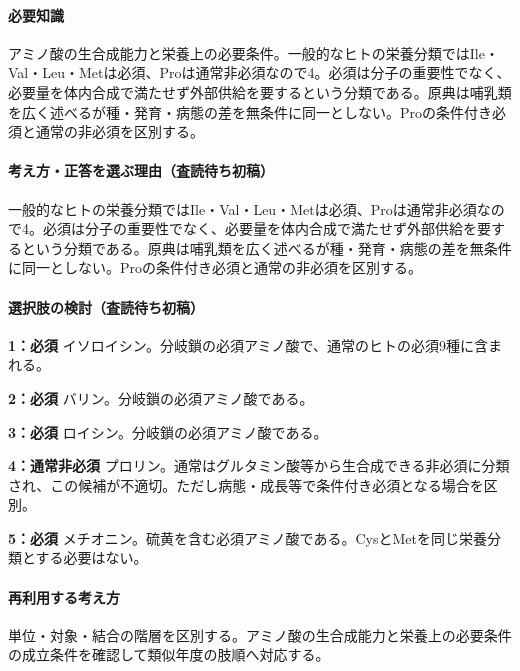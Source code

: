 \paragraph{必要知識} アミノ酸の生合成能力と栄養上の必要条件。一般的なヒトの栄養分類ではIle・Val・Leu・Metは必須、Proは通常非必須なので4。必須は分子の重要性でなく、必要量を体内合成で満たせず外部供給を要するという分類である。原典は哺乳類を広く述べるが種・発育・病態の差を無条件に同一としない。Proの条件付き必須と通常の非必須を区別する。

\paragraph{考え方・正答を選ぶ理由（査読待ち初稿）} 一般的なヒトの栄養分類ではIle・Val・Leu・Metは必須、Proは通常非必須なので4。必須は分子の重要性でなく、必要量を体内合成で満たせず外部供給を要するという分類である。原典は哺乳類を広く述べるが種・発育・病態の差を無条件に同一としない。Proの条件付き必須と通常の非必須を区別する。

\paragraph{選択肢の検討（査読待ち初稿）}\mbox{}\par

\noindent\textbf{1：必須} イソロイシン。分岐鎖の必須アミノ酸で、通常のヒトの必須9種に含まれる。\par

\noindent\textbf{2：必須} バリン。分岐鎖の必須アミノ酸である。\par

\noindent\textbf{3：必須} ロイシン。分岐鎖の必須アミノ酸である。\par

\noindent\textbf{4：通常非必須} プロリン。通常はグルタミン酸等から生合成できる非必須に分類され、この候補が不適切。ただし病態・成長等で条件付き必須となる場合を区別。\par

\noindent\textbf{5：必須} メチオニン。硫黄を含む必須アミノ酸である。CysとMetを同じ栄養分類とする必要はない。\par

\paragraph{再利用する考え方} 単位・対象・結合の階層を区別する。アミノ酸の生合成能力と栄養上の必要条件の成立条件を確認して類似年度の肢順へ対応する。

